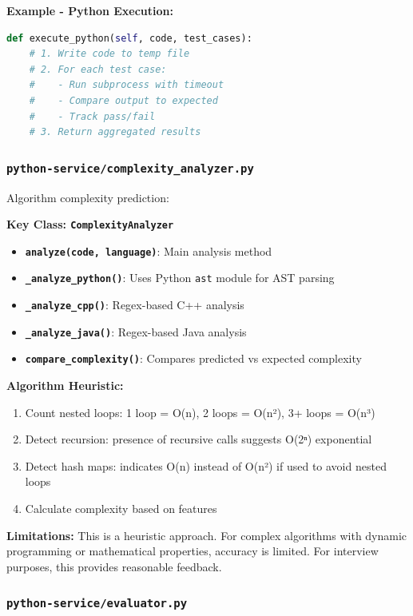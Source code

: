 \documentclass[12pt,a4paper,oneside]{article}
\newcommand{\fileref}[1]{\texttt{#1}}
\newcommand{\funcname}[1]{\texttt{\textbf{#1}}}
\newcommand{\classname}[1]{\texttt{\textbf{#1}}}
\begin{document}
\textbf{Example - Python Execution:}

\begin{lstlisting}[language=Python]
def execute_python(self, code, test_cases):
    # 1. Write code to temp file
    # 2. For each test case:
    #    - Run subprocess with timeout
    #    - Compare output to expected
    #    - Track pass/fail
    # 3. Return aggregated results
\end{lstlisting}

\subsubsection{\fileref{python-service/complexity\_analyzer.py}}

Algorithm complexity prediction:

\textbf{Key Class: \classname{ComplexityAnalyzer}}

\begin{itemize}
    \item \funcname{analyze(code, language)}: Main analysis method
    \item \funcname{\_analyze\_python()}: Uses Python \texttt{ast} module for AST parsing
    \item \funcname{\_analyze\_cpp()}: Regex-based C++ analysis
    \item \funcname{\_analyze\_java()}: Regex-based Java analysis
    \item \funcname{compare\_complexity()}: Compares predicted vs expected complexity
\end{itemize}

\textbf{Algorithm Heuristic:}

\begin{enumerate}
    \item Count nested loops: 1 loop = O(n), 2 loops = O(n²), 3+ loops = O(n³)
    \item Detect recursion: presence of recursive calls suggests O(2ⁿ) exponential
    \item Detect hash maps: indicates O(n) instead of O(n²) if used to avoid nested loops
    \item Calculate complexity based on features
\end{enumerate}

\textbf{Limitations:} This is a heuristic approach. For complex algorithms with dynamic programming or mathematical properties, accuracy is limited. For interview purposes, this provides reasonable feedback.

\subsubsection{\fileref{python-service/evaluator.py}}
\end{document}
